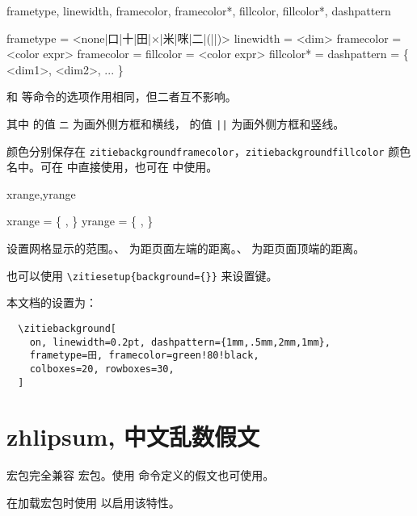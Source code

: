 \documentclass{ctxdoc}
\begin{document}
\begin{function}{
  frametype,
  linewidth,
  framecolor,
  framecolor*,
  fillcolor,
  fillcolor*,
  dashpattern
}
  \begin{syntax}
    frametype   = <none|口|十|田|×|米|咪|二|(||)> 
    linewidth   = <dim> \init{0.4pt}
    framecolor  = <color expr> 
    framecolor  =  
    fillcolor   = <color expr>
    fillcolor*  =  
    dashpattern = \{ <dim1>, <dim2>, ... \}
  \end{syntax}
  和  等命令的选项作用相同，但二者互不影响。

  其中  的值 \verb|二| 为画外侧方框和横线， 的值 \verb=||= 为画外侧方框和竖线。

  颜色分别保存在 \verb|zitiebackgroundframecolor|，\verb|zitiebackgroundfillcolor| 颜色名中。可在  中直接使用，也可在  中使用。
\end{function}

\begin{function}{xrange,yrange}
  \begin{syntax}
    xrange = \{  ,  \} \init{{0cm, \paperwidth}}
    yrange = \{  ,  \} \init{{0cm, \paperheight}}
  \end{syntax}
  设置网格显示的范围。、 为距页面左端的距离。、 为距页面顶端的距离。
\end{function}

也可以使用 \verb|\zitiesetup{background={|\verb|}}| 来设置键。

本文档的设置为：
\begin{verbatim}
  \zitiebackground[
    on, linewidth=0.2pt, dashpattern={1mm,.5mm,2mm,1mm},
    frametype=田, framecolor=green!80!black,
    colboxes=20, rowboxes=30,
  ]
\end{verbatim}

\section{zhlipsum, 中文乱数假文}

 宏包完全兼容  宏包\cite{pkg-zhlipsum}。使用  命令定义的假文也可使用。

在加载宏包时使用  以启用该特性。
\end{document}

